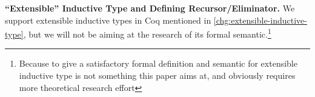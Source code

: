 



\textbf{``Extensible'' Inductive Type and Defining Recursor/Eliminator.}
We support extensible inductive types in Coq mentioned in
\ref{chg:extensible-inductive-type}, but we will not be aiming at the
research of its formal semantic.\footnote{Because to give a satisfactory
formal definition and semantic for extensible inductive type is not
something this paper aims at, and obviously requires more theoretical
research effort}



